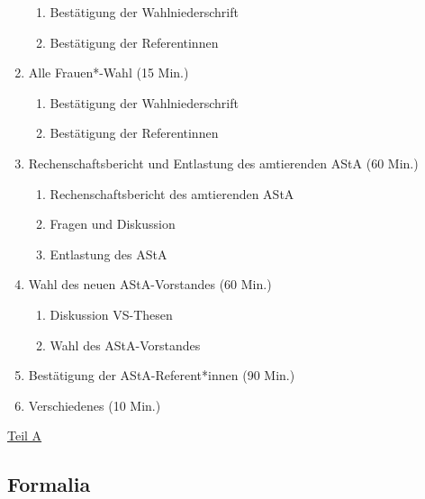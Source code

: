 \documentclass[ngerman,headheight=70pt]{scrartcl}
\begin{document}
\begin{enumerate}[label={\textbf{Top \theenumi}},leftmargin=*]
            \begin{enumerate}
                \item Bestätigung der Wahlniederschrift
                \item Bestätigung der Referentinnen
            \end{enumerate}
        \item Alle Frauen*-Wahl (15 Min.)
            \begin{enumerate}
                \item Bestätigung der Wahlniederschrift
                \item Bestätigung der Referentinnen
            \end{enumerate}
        \item Rechenschaftsbericht und Entlastung des amtierenden AStA (60 Min.)
            \begin{enumerate}
                \item Rechenschaftsbericht des amtierenden AStA
                \item Fragen und Diskussion
                \item Entlastung des AStA
              \end{enumerate}
        \item Wahl des neuen AStA-Vorstandes (60 Min.)
            \begin{enumerate}
                \item Diskussion VS-Thesen
                \item Wahl des AStA-Vorstandes
            \end{enumerate}
        \item Bestätigung der AStA-Referent*innen (90 Min.)
        \item Verschiedenes (10 Min.)
    \end{enumerate}

    \newpage


    {\Large \underline{Teil A}}

    \subsection{Formalia}
\end{document}
